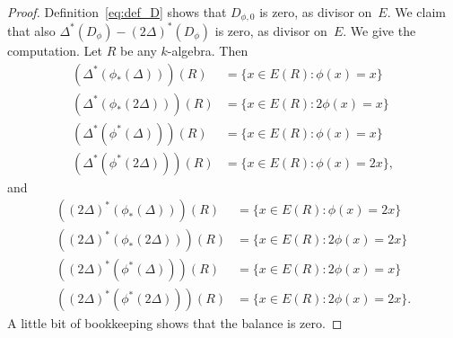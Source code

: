 \begin{proof}
Definition~\eqref{eq:def_D} shows that $D_{\phi,0}$ is zero, as
divisor on~$E$. We claim that also
$\Delta^*(D_\phi)-(2\Delta)^*(D_\phi)$ is zero, as divisor on~$E$. We
give the computation. Let $R$ be any $k$-algebra. Then
\begin{align*}
(\Delta^*(\phi_*(\Delta)))(R) & = \{x\in E(R) : \phi(x)=x\}\\
(\Delta^*(\phi_*(2\Delta)))(R) & = \{x\in E(R) : 2\phi(x)=x\}\\
(\Delta^*(\phi^*(\Delta)))(R) & = \{x\in E(R) : \phi(x)=x\}\\
(\Delta^*(\phi^*(2\Delta)))(R) & = \{x\in E(R) : \phi(x)=2x\},
\end{align*}
and
\begin{align*}
((2\Delta)^*(\phi_*(\Delta)))(R) & = \{x\in E(R) : \phi(x)=2x\}\\
((2\Delta)^*(\phi_*(2\Delta)))(R) & = \{x\in E(R) : 2\phi(x)=2x\}\\
((2\Delta)^*(\phi^*(\Delta)))(R) & = \{x\in E(R) : 2\phi(x)=x\}\\
((2\Delta)^*(\phi^*(2\Delta)))(R) & = \{x\in E(R) : 2\phi(x)=2x\}.
\end{align*}
A little bit of bookkeeping shows that the balance is zero.
\end{proof}

